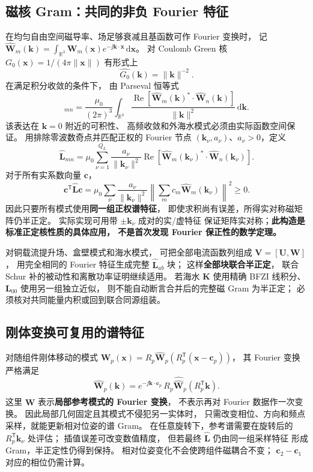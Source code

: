 \subsection{磁核 Gram：共同的非负 Fourier 特征}
在均匀自由空间磁导率、场足够衰减且基函数可作 Fourier 变换时，
记 \(\widehat{\bm W}_m(\bm k)=
\int_{\mathbb R^3}\bm W_m(\bm x)e^{-\jj\bm k\cdot\bm x}\,\mathrm d\bm x\)。
对 Coulomb Green 核
\(G_0(\bm x)=1/(4\pi\|\bm x\|)\)
有形式上
\[
\widehat{G_0}(\bm k)=\|\bm k\|^{-2}.
\]
在满足积分收敛的条件下，
由 Parseval 恒等式
\begin{equation}
[\bm L]_{mn}
=\frac{\mu_0}{(2\pi)^3}
\int_{\mathbb R^3}
\frac{\operatorname{Re}[
\widehat{\bm W}_m(\bm k)^*\cdot
\widehat{\bm W}_n(\bm k)]}
{\|\bm k\|^2}\,\mathrm d\bm k.
\label{eq:magnetic-fourier}
\end{equation}
该表达在 \(\bm k=0\) 附近的可积性、
高频收敛和外海水模式必须由实际函数空间保证。
用排除零波数奇点并匹配正权的 Fourier 节点
\((\bm k_\nu,a_\nu)\)、\(a_\nu>0\)，定义
\begin{equation}
\boxed{
\widehat{\bm L}_{mn}=
\mu_0\sum_{\nu=1}^{Q_L}
\frac{a_\nu}{\|\bm k_\nu\|^2}
\operatorname{Re}\!\left[
\widehat{\bm W}_m(\bm k_\nu)^*\cdot
\widehat{\bm W}_n(\bm k_\nu)\right].
}
\label{eq:L-positive}
\end{equation}
对于所有实系数向量 \(\bm c\)，
\[
\bm c^{\mathsf T}\widehat{\bm L}\bm c
=\mu_0\sum_\nu
\frac{a_\nu}{\|\bm k_\nu\|^2}
\left\|\sum_m c_m\widehat{\bm W}_m(\bm k_\nu)\right\|^2
\ge0.
\]
因此只要所有模式使用\textbf{同一组正权谱特征}，
即使求积尚有误差，所得实对称磁矩阵仍半正定。
实际实现可用带 \(\pm\bm k_\nu\) 成对的实/虚特征
保证矩阵实对称；\textbf{此构造是标准正定核性质的具体应用，
不是首次发现 Fourier 保正性的数学定理。}

对铜载流提升场、盒壁模式和海水模式，
可把全部电流函数列组成 \(\bm V=[\bm U,\bm W]\)，
用完全相同的 Fourier 特征生成完整
\(\widehat{\bm L}_{ab}\) 块；
这样\textbf{全部块联合半正定}，
联合 Schur 补的被动性和离散功率证明继续适用。
若海水 \(\bm K\) 使用精确 BFZI 线积分、
\(\bm L_{00}\) 使用另一组独立近似，
则不能自动断言合并后的完整磁 Gram 为半正定；
必须核对共同能量内积或回到联合同源组装。

\subsection{刚体变换可复用的谱特征}
对随组件刚体移动的模式
\(\bm W_p(\bm x)
=R_p\widehat{\bm W}_p(R_p^{\mathsf T}(\bm x-\bm c_p))\)，
其 Fourier 变换严格满足
\begin{equation}
\boxed{
\widehat{\bm W}_p(\bm k)
=e^{-\jj\bm k\cdot\bm c_p}\,
R_p\widehat{\widehat{\bm W}}_p(R_p^{\mathsf T}\bm k).
}
\label{eq:rigid-fourier}
\end{equation}
这里 \(\widehat{\widehat{\bm W}}\) 表示\textbf{局部参考模式的 Fourier 变换}，
不表示再对 Fourier 数据作一次变换。
因此局部几何固定且其模式不侵犯另一实体时，
只需改变相位、方向和频点采样，就能更新相对位姿的谱 Gram。
在任意旋转下，参考谱需要在旋转后的
\(R_p^{\mathsf T}\bm k_\nu\) 处评估；
插值误差可改变数值精度，
但若最终 \(\widehat{\bm L}\) 仍由同一组采样特征
形成 Gram，半正定性仍得到保持。
相对位姿变化不会使跨组件磁耦合不变；
\(\bm c_2-\bm c_1\) 对应的相位仍需计算。

